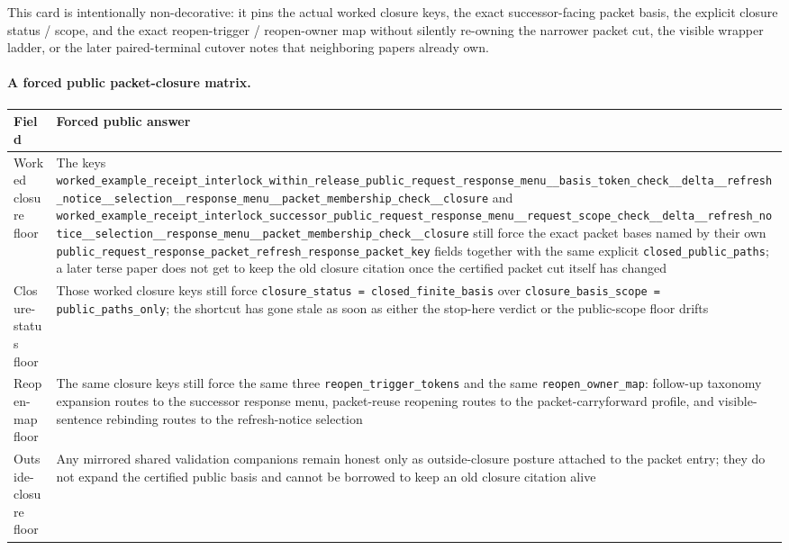 \documentclass[11pt]{article}
\begin{document}
This card is intentionally non-decorative: it pins the actual worked closure keys, the exact successor-facing packet basis, the explicit closure status / scope, and the exact reopen-trigger / reopen-owner map without silently re-owning the narrower packet cut, the visible wrapper ladder, or the later paired-terminal cutover notes that neighboring papers already own.\cite{series:workedexample}

\paragraph{A forced public packet-closure matrix.}
\begin{table}[t]
\centering
\small
\begin{tabularx}{\linewidth}{@{}lX@{}}
\toprule
Field & Forced public answer \\
\midrule
Worked closure floor & The keys \nolinkurl{worked_example_receipt_interlock_within_release_public_request_response_menu__basis_token_check__delta__refresh_notice__selection__response_menu__packet_membership_check__closure} and \nolinkurl{worked_example_receipt_interlock_successor_public_request_response_menu__request_scope_check__delta__refresh_notice__selection__response_menu__packet_membership_check__closure} still force the exact packet bases named by their own \nolinkurl{public_request_response_packet_refresh_response_packet_key} fields together with the same explicit \nolinkurl{closed_public_paths}; a later terse paper does not get to keep the old closure citation once the certified packet cut itself has changed \\
Closure-status floor & Those worked closure keys still force \nolinkurl{closure_status = closed_finite_basis} over \nolinkurl{closure_basis_scope = public_paths_only}; the shortcut has gone stale as soon as either the stop-here verdict or the public-scope floor drifts \\
Reopen-map floor & The same closure keys still force the same three \nolinkurl{reopen_trigger_tokens} and the same \nolinkurl{reopen_owner_map}: follow-up taxonomy expansion routes to the successor response menu, packet-reuse reopening routes to the packet-carryforward profile, and visible-sentence rebinding routes to the refresh-notice selection \\
Outside-closure floor & Any mirrored shared validation companions remain honest only as outside-closure posture attached to the packet entry; they do not expand the certified public basis and cannot be borrowed to keep an old closure citation alive \\

\end{tabularx}
\end{table}
\end{document}
